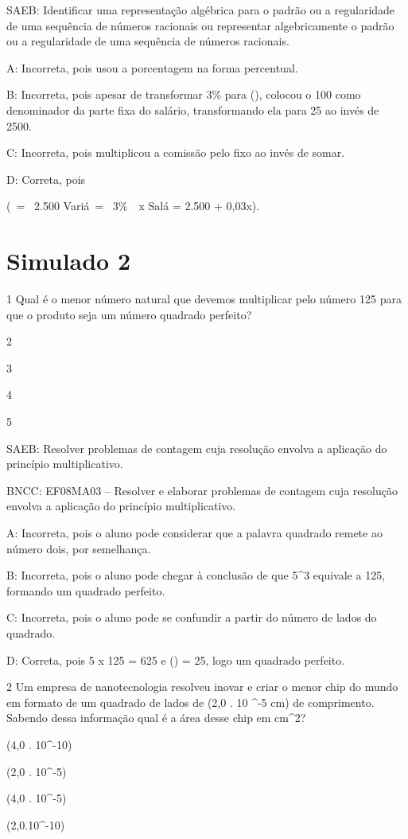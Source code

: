 {SAEB: Identificar uma representação algébrica para o padrão ou a
regularidade de uma sequência de números racionais ou representar
algebricamente o padrão ou a regularidade de uma sequência de números
racionais.

A: Incorreta, pois usou a porcentagem na forma percentual.

B: Incorreta, pois apesar de transformar 3\% para (),
colocou o 100 como denominador da parte fixa do salário, transformando
ela para 25 ao invés de 2500.

C: Incorreta, pois multiplicou a comissão pelo fixo ao invés de somar.

D: Correta, pois

(\ = \ 2.500 \; {Vari}á\  = \ 3\%\ \ x \; {Sal}á = 2.500 + 0,03x).


\section{Simulado 2}

\num{1} Qual é o menor número natural que devemos multiplicar pelo número 125
para que o produto seja um número quadrado perfeito?
\item 2
\item 3
\item 4
\item 5

SAEB: Resolver problemas de contagem cuja resolução envolva a aplicação
do princípio multiplicativo.

BNCC: EF08MA03 -- Resolver e elaborar problemas de contagem cuja
resolução envolva a aplicação do princípio multiplicativo.

A: Incorreta, pois o aluno pode considerar que a palavra quadrado remete
ao número dois, por semelhança.

B: Incorreta, pois o aluno pode chegar à conclusão de que 5^3 equivale a
125, formando um quadrado perfeito.

C: Incorreta, pois o aluno pode se confundir a partir do número de lados
do quadrado.

D: Correta, pois 5 x 125 = 625 e () = 25, logo um quadrado
perfeito.

\num{2} Um empresa de nanotecnologia resolveu inovar e criar o menor chip do
mundo em formato de um quadrado de lados de (2,0 . 10 ^{-5 cm}) de
comprimento. Sabendo dessa informação qual é a área desse chip em cm^2?
\item (4,0 . 10^{-10})
\item (2,0 . 10^{-5})
\item (4,0 . 10^{-5})
\item (2,0.10^{-10})

}
